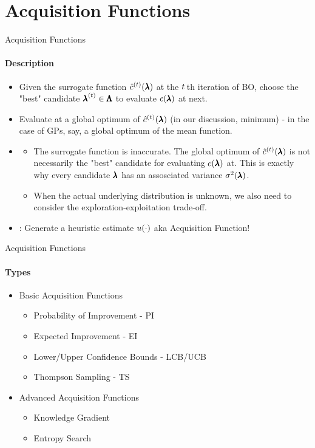 \section{Acquisition Functions}
\begin{frame}[c]{Acquisition Functions}
\framesubtitle{Description}
\begin{itemize}
    \item {} Given the surrogate function ${\hat{c}}^{(t)}(\pmb{\lambda})$ at the $t\,$th iteration of BO, choose the "best" candidate ${\pmb{\lambda}}^{(t)}\in \pmb{\Lambda}$ to evaluate $c(\pmb{\lambda})$ at next.
    \pause
    \item {} Evaluate at a global optimum of ${\hat{c}}^{(t)}(\pmb{\lambda})$ (in our discussion, minimum) - in the case of GPs, say, a global optimum of the mean function.
    \pause
    \item {}
    \begin{itemize}
        \pause
        \item The surrogate function is inaccurate. The global optimum of ${\hat{c}}^{(t)}(\pmb{\lambda})$ is not necessarily the "best" candidate for evaluating $c(\pmb{\lambda})$ at. This is exactly why every candidate $\pmb{\lambda}$ has an assosciated variance $\sigma^2(\pmb{\lambda})$.
        \pause
        \item When the actual underlying distribution is unknown, we also need to consider the exploration-exploitation trade-off.
    \end{itemize}
    \pause
    \item {}: Generate a heuristic estimate $u(\cdot)$ aka Acquisition Function!
\end{itemize}

\end{frame}
\begin{frame}[c]{Acquisition Functions}
\framesubtitle{Types}
\begin{itemize}
    \item Basic Acquisition Functions
    \begin{itemize}
        \item Probability of Improvement - PI
        \item Expected Improvement - EI
        \item Lower/Upper Confidence Bounds - LCB/UCB
        \item Thompson Sampling - TS
    \end{itemize}
    \item Advanced Acquisition Functions
    \begin{itemize}
        \item Knowledge Gradient
        \item Entropy Search
    \end{itemize}
\end{itemize}

\end{frame}
